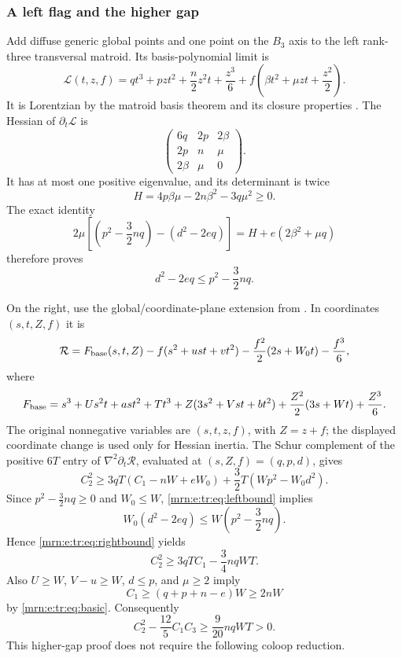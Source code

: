 \documentclass[11pt,a4paper]{article}
\theoremstyle{remark}\newtheorem{remark}[theorem]{Remark}
\begin{document}
\subsubsection{A left flag and the higher gap}
Add diffuse generic global points and one point on the $B_3$ axis to the left rank-three transversal matroid. Its basis-polynomial limit is
\begin{equation}\label{mrn:e:tr:eq:leftflag}
 \mathcal L(t,z,f)=qt^3+pzt^2+\frac n2z^2t+\frac{z^3}{6}
       +f\left(\beta t^2+\mu zt+\frac{z^2}{2}\right).
\end{equation}
It is Lorentzian by the matroid basis theorem and its closure properties \cite{b:BH}. The Hessian of $\partial_t\mathcal L$ is
\[
 \begin{pmatrix}
 6q&2p&2\beta\\
 2p&n&\mu\\
 2\beta&\mu&0
 \end{pmatrix}.
\]
It has at most one positive eigenvalue, and its determinant is twice
\[
 H=4p\beta\mu-2n\beta^2-3q\mu^2\ge0.
\]
The exact identity
\[
 2\mu\left[\left(p^2-\frac32nq\right)-(d^2-2eq)\right]
   =H+e(2\beta^2+\mu q)
\]
therefore proves
\begin{equation}\label{mrn:e:tr:eq:leftbound}
 d^2-2eq\le p^2-\frac32nq.
\end{equation}

On the right, use the global/coordinate-plane extension from \cite{b:m38}. In coordinates $(s,t,Z,f)$ it is
\[
 \mathcal R=F_{\rm base}(s,t,Z)
       -f(s^2+ust+vt^2)-\frac{f^2}{2}(2s+W_0t)-\frac{f^3}{6},
\]
where
\[
 F_{\rm base}=s^3+Us^2t+ast^2+Tt^3
 +Z(3s^2+Vst+bt^2)+\frac{Z^2}{2}(3s+Wt)+\frac{Z^3}{6}.
\]
The original nonnegative variables are $(s,t,z,f)$, with $Z=z+f$; the displayed coordinate change is used only for Hessian inertia. The Schur complement of the positive $6T$ entry of $\nabla^2\partial_t\mathcal R$, evaluated at $(s,Z,f)=(q,p,d)$, gives
\begin{equation}\label{mrn:e:tr:eq:rightbound}
 C_2^2\ge3qT(C_1-nW+eW_0)+\frac32T(Wp^2-W_0d^2).
\end{equation}
Since $p^2-\frac32nq\ge0$ and $W_0\le W$, \eqref{mrn:e:tr:eq:leftbound} implies
\[
 W_0(d^2-2eq)\le W\left(p^2-\frac32nq\right).
\]
Hence \eqref{mrn:e:tr:eq:rightbound} yields
\[
 C_2^2\ge3qTC_1-\frac34nqWT.
\]
Also $U\ge W$, $V-u\ge W$, $d\le p$, and $\mu\ge2$ imply
\[
 C_1\ge(q+p+n-e)W\ge2nW
\]
by \eqref{mrn:e:tr:eq:basic}. Consequently
\begin{equation}\label{mrn:e:tr:eq:higher}
 C_2^2-\frac{12}{5}C_1C_3
   \ge\frac9{20}nqWT>0.
\end{equation}
This higher-gap proof does not require the following coloop reduction.
\end{document}

